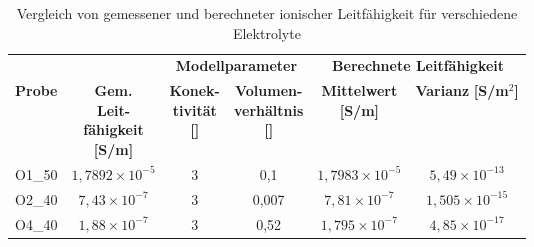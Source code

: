 \begin{table}[htbp]
    \label{tab:wost_result}
    \centering
    \caption{Vergleich von gemessener und berechneter ionischer Leitfähigkeit für verschiedene Elektrolyte}
    \renewcommand{\arraystretch}{1.3}
    \begin{tabular}{l|c|cc|cc}
    \toprule
     & & \multicolumn{2}{|c|}{\textbf{Modellparameter}} & \multicolumn{2}{c}{\textbf{Berechnete Leitfähigkeit}} \\
     \textbf{Probe} 
     & \makecell{\textbf{Gem.}\\\textbf{Leit-}\\\textbf{fähigkeit}\\\textbf{[S/m]}} 
     & \makecell{\textbf{Konek-}\\\textbf{tivität}\\\textbf{[\;]}}
     & \makecell{\textbf{Volumen-}\\\textbf{verhältnis}\\\textbf{[\;]}} 
     & \makecell{\textbf{Mittelwert}\\\textbf{[S/m]}} 
     & \makecell{\textbf{Varianz}\\\textbf{[S/m$^2$]}}
     \\
    \midrule
    O1\_50 & $1,7892 \times 10^{-5}$ & 3 & 0,1   & $1,7983 \times 10^{-5}$ & $5,49 \times 10^{-13}$ \\
    O2\_40 & $7,43 \times 10^{-7}$  & 3 & 0,007 & $7,81 \times 10^{-7}$  & $1,505 \times 10^{-15}$ \\
    O4\_40 & $1,88 \times 10^{-7}$  & 3 & 0,52  & $1,795 \times 10^{-7}$ & $4,85 \times 10^{-17}$ \\
    \bottomrule
    \end{tabular}
\end{table}
    